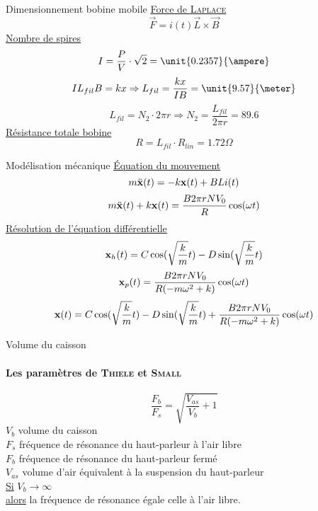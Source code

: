 \documentclass[pdf]{beamer}
\newcommand\fv[1]{{\bf #1}} %
\newcommand\fvdd[1]{\ddot{\bf #1}} %
\begin{document}
\begin{frame}{Dimensionnement bobine mobile}
\underline{Force de \textsc{Laplace}}
$$\vec{F} = i(t)\vec{L}\times{\vec{B}}$$ 
\underline{Nombre de spires}
$$I = \frac{P}{V} \cdot{\sqrt{2}} = \unit{0.2357}{\ampere}$$
$$IL_{fil}B = kx \Rightarrow L_{fil} = \frac{kx}{IB} = \unit{9.57}{\meter}$$
$$L_{fil} = N_2 \cdot 2\pi r \Rightarrow N_2 = \frac{L_{fil}}{2\pi r} = 89.6$$
\underline{Résistance totale bobine}
$$R = L_{fil} \cdot R_{lin} = 1.72 \Omega$$
\end{frame}
\begin{frame}{Modélisation mécanique}
\underline{Équation du mouvement}
$$m\fvdd{x}(t) = -k\fv{x}(t) + BLi(t)$$
$$m\fvdd{x}(t) + k\fv{x}(t) = \frac{B2\pi rNV_0}{R}\cos (\omega t)$$
\underline{Résolution de l'équation différentielle}
$$\fv{x}_h(t) = C\cos(\sqrt{\frac{k}{m}}t) - D\sin(\sqrt{\frac{k}{m}}t)$$
$$\fv{x}_p(t) = \frac{B2\pi rNV_0}{R(-m\omega^2 + k)} \cos (\omega t)$$
$$\fv{x}(t) = C\cos(\sqrt{\frac{k}{m}}t) - D\sin(\sqrt{\frac{k}{m}}t) + \frac{B2\pi rNV_0}{R(-m\omega^2 + k)} \cos (\omega t)$$
\end{frame}
\begin{frame}{Volume du caisson}
\framesubtitle{Les paramètres de \textsc{Thiele} et \textsc{Small}}
$$\frac{F_b}{F_s} = \sqrt{\frac{V_{as}}{V_b} + 1}$$
$V_b$ volume du caisson \\
$F_s$ fréquence de résonance du haut-parleur à l'air libre \\
$F_b$ fréquence de résonance du haut-parleur fermé\\
$V_{as}$ volume d'air équivalent à la suspension du haut-parleur\\
\bigbreak
\underline{Si} $V_b\rightarrow \infty$ \\
\underline{alors} 
la fréquence de résonance égale celle à l'air libre.
\end{frame}
\end{document}
